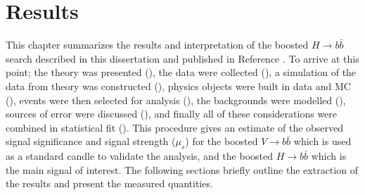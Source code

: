 \chapter{Results} \label{chap:results}

This chapter summarizes the results and interpretation of the boosted $H
\rightarrow b\bar{b}$ search described in this dissertation and published in
Reference \cite{ATLAS-CONF-2018-052}.  To arrive at this point; the theory was
presented (), the data were collected
(), a simulation of the data from theory was
constructed (), physics objects were built in data and MC
(), events were then selected for analysis
(), the backgrounds were modelled
(), sources of error were discussed
(), and finally all of these considerations were
combined in statistical fit (). This procedure gives an estimate
of the observed signal significance and signal strength ($\mu_{s}$) for the
boosted $V \rightarrow b\bar{b}$ which is used as a standard candle to validate
the analysis, and the boosted $H \rightarrow b\bar{b}$ which is the main signal
of interest. The following sections briefly outline the extraction of the
results and present the measured quantities.





